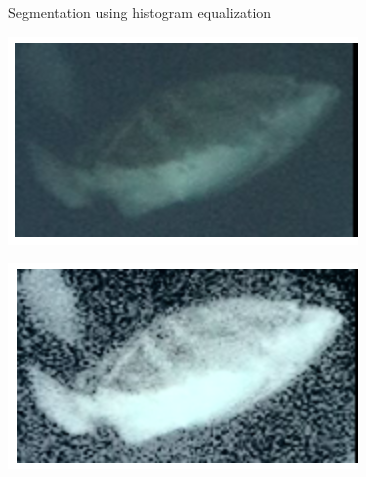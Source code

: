 \begin{frame}{Segmentation using histogram equalization}
    \begin{minipage}{0.5\textwidth}
        \centering
        \includegraphics[width=\textwidth,keepaspectratio]{images/gm4-4.png}
    \end{minipage}%
    \begin{minipage}{0.5\textwidth}
        \centering
        \includegraphics[width=\textwidth,keepaspectratio]{images/gm4-3.png}
    \end{minipage}
\end{frame}




